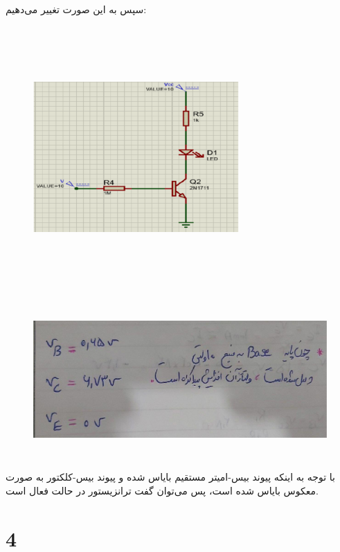 \documentclass[12pt]{article}
\begin{document}
سپس به این صورت تغییر می‌دهیم:
\begin{figure}[H]
	\begin{center}
		\includegraphics[width=0.7\textwidth, height=10cm]{./images/9.6}
	\end{center}
\end{figure}
\begin{figure}[H]
	\begin{center}
		\includegraphics[width=\textwidth, height=6cm]{./images/9.6.1}
	\end{center}
\end{figure}

با توجه به اینکه پیوند بیس-امیتر مستقیم بایاس شده و پیوند بیس-کلکتور به صورت معکوس بایاس شده است، پس می‌توان گفت ترانزیستور‌ در حالت فعال است.

\clearpage
\section{4}
\end{document}

